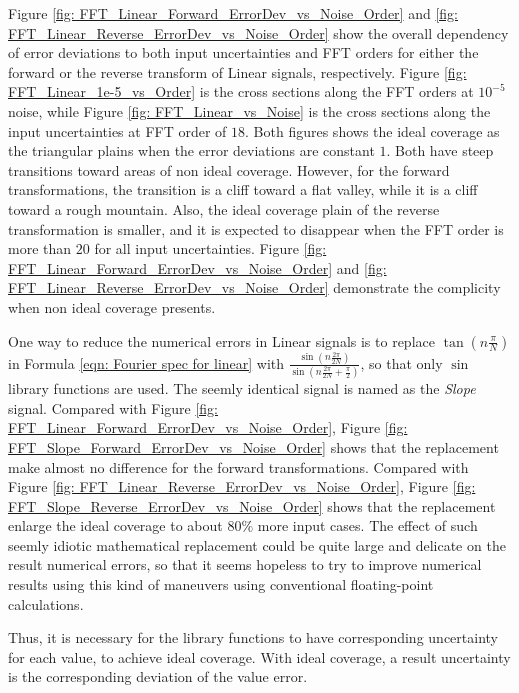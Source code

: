 \documentclass[twoside]{article}
\numberwithin{equation}{section}
\begin{document}
Figure \ref{fig: FFT_Linear_Forward_ErrorDev_vs_Noise_Order} and \ref{fig: FFT_Linear_Reverse_ErrorDev_vs_Noise_Order} show the overall dependency of error deviations to both input uncertainties and FFT orders for either the forward or the reverse transform of Linear signals, respectively.
Figure \ref{fig: FFT_Linear_1e-5_vs_Order} is the cross sections along the FFT orders at $10^{-5}$ noise, while Figure \ref{fig: FFT_Linear_vs_Noise} is the cross sections along the input uncertainties at FFT order of $18$.
Both figures shows the ideal coverage as the triangular plains when the error deviations are constant $1$.
Both have steep transitions toward areas of non ideal coverage.
However, for the forward transformations, the transition is a cliff toward a flat valley, while it is a cliff toward a rough mountain.
Also, the ideal coverage plain of the reverse transformation is smaller, and it is expected to disappear when the FFT order is more than $20$ for all input uncertainties.
Figure \ref{fig: FFT_Linear_Forward_ErrorDev_vs_Noise_Order} and \ref{fig: FFT_Linear_Reverse_ErrorDev_vs_Noise_Order} demonstrate the complicity when non ideal coverage presents.

One way to reduce the numerical errors in Linear signals is to replace $\tan(n \frac{\pi}{N})$ in Formula \eqref{eqn: Fourier spec for linear} with $\frac{\sin(n \frac{2\pi}{2N})}{\sin(n \frac{2\pi}{2N} + \frac{\pi}{2})}$, so that only $\sin$ library functions are used.
The seemly identical signal is named as the \emph{Slope} signal.
Compared with Figure \ref{fig: FFT_Linear_Forward_ErrorDev_vs_Noise_Order}, Figure \ref{fig: FFT_Slope_Forward_ErrorDev_vs_Noise_Order} shows that the replacement make almost no difference  for the forward transformations.
Compared with Figure \ref{fig: FFT_Linear_Reverse_ErrorDev_vs_Noise_Order}, Figure \ref{fig: FFT_Slope_Reverse_ErrorDev_vs_Noise_Order} shows that the replacement enlarge the ideal coverage to about $80\%$ more input cases.
The effect of such seemly idiotic mathematical replacement could be quite large and delicate on the result numerical errors, so that it seems hopeless to try to improve numerical results using this kind of maneuvers using conventional floating-point calculations.

Thus, it is necessary for the library functions to have corresponding uncertainty for each value, to achieve ideal coverage.
With ideal coverage, a result uncertainty is the corresponding deviation of the value error.
\end{document}
